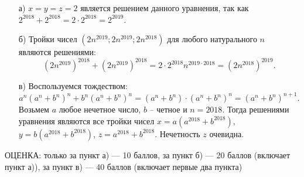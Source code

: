 \solutionSection
\begin{enumerate}    
   \item [а)] $x=y=z=2$ является решением данного уравнения, так как $2^{2018}+2^{2018}=2\cdot2^{2018}=2^{2019}$.

   \item [б)]  Тройки чисел $(2n^{2019};2n^{2019};2n^{2018})$ для любого натурального $n$ являются решениями: $$(2n^{2019})^{2018}+(2n^{2019})^{2018}=2\cdot2^{2018}n^{2019\cdot2018}=(2n^{2018})^{2019}.$$

   \item [в)] Воспользуемся тождеством: 
    $$
    a^n(a^n+b^n)^n+b^n(a^n+b^n)^n=(a^n+b^n)\cdot(a^n+b^n)^n=(a^n+b^n)^{n+1}.
    $$
    Возьмем $a$ любое нечетное число, $b$ -- четное и $n=2018$. Тогда решениями уравнения являются все тройки чисел $x=a(a^{2018}+b^{2018}),$ $y=b(a^{2018}+b^{2018})$, $z=a^{2018}+b^{2018}.$ Нечетность $z$ очевидна.
\end{enumerate}

\additionalCriteria
ОЦЕНКА: только за пункт а) --- 10 баллов, за пункт б) --- 20 баллов (включает пункт а)), за пункт в) --- 40 баллов (включает первые два пункта)
